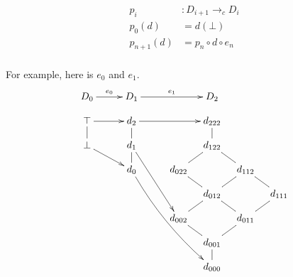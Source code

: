 \documentclass{tufte-handout}
\begin{document}
\begin{center}
\begin{minipage}{0.5\textwidth}
\begin{align*}
  p_i &: D_{i+1} \to_c D_i  \\
  p_0(d) &= d(\bot) \\
  p_{n+1}(d) &= p_n \circ d \circ e_n\\
\end{align*}
\end{minipage}
\begin{minipage}{0.5\textwidth}
\end{minipage} 
\end{center}

For example, here is $e_0$ and $e_1$.
\[
\xymatrix@=10pt{
  D_0 \ar[rr]^{e_0}&& D_1 \ar[rrr]^{e_1}& & & D_2 \\
     \top \ar@{-}[d] \ar[rr]&& d_2 \ar@{-}[d] \ar[rrr] &&     & d_{222} \ar@{-}[d]\\
     \bot \ar[drr]&& d_1 \ar@{-}[d] \ar[rrddd] &  &   & d_{122} \ar@{-}[dl] \ar@{-}[dr]\\
     && d_0 \ar@/_/[rrrdddd] && d_{022} \ar@{-}[dr]&     & d_{112} \ar@{-}[dl] \ar@{-}[dr]\\
     && &  &   & d_{012} \ar@{-}[dl]\ar@{-}[dr]&      & d_{111} \ar@{-}[dl]\\
     && & &d_{002} \ar@{-}[dr]&     & d_{011} \ar@{-}[dl]\\
     && & &    & d_{001} \ar@{-}[d]\\
     && & &    & d_{000} 
    } 
\]







\end{document}
